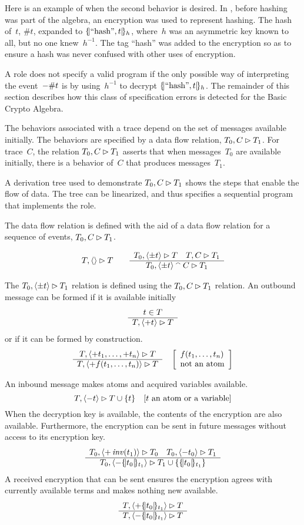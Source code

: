 \documentclass[12pt]{report}
\theoremstyle{definition}
\begin{document}
Here is an example of when the second behavior is desired.  In
{\cpsa}, before hashing was part of the algebra, an encryption was
used to represent hashing.  The hash of~$t$, $\#t$, expanded to
$\{\!|\mbox{``hash''},t|\!\}_{h}$, where~$h$ was an asymmetric key known to
all, but no one knew~$h^{-1}$.  The tag ``hash'' was added to the
encryption so as to ensure a hash was never confused with other uses of
encryption.

A role does not specify a valid program if the only possible way of
interpreting the event~$\mathord -\#t$ is by using~$h^{-1}$ to decrypt
$\{\!|\mbox{``hash''},t|\!\}_{h}$.  The remainder of this section describes
how this class of specification errors is detected for the Basic Crypto
Algebra.

The behaviors associated with a trace depend on the set of messages
available initially.  The behaviors are specified by a data flow
relation, $T_0,C\rhd T_1$.  For trace~$C$, the relation
$T_0,C\rhd T_1$ asserts that when messages~$T_0$ are available
initially, there is a behavior of~$C$ that produces messages~$T_1$.

A derivation tree used to demonstrate $T_0,C\rhd T_1$ shows the steps
that enable the flow of data.  The tree can be linearized, and thus
specifies a sequential program that implements the role.

The data flow relation is defined with the aid of a data flow relation
for a sequence of events, $T_0,C\rhd T_1$.

$$\flow{T}{\seq{}}{T}\qquad
\infer{\flow{T_0}{\seq{\pm t}}{T}\quad\flow{T}{C}{T_1}}%
{\flow{T_0}{\seq{\pm t}\append C}{T_1}}$$

The $T_0,\langle\pm t\rangle\rhd T_1$ relation is defined using the
$T_0,C\rhd T_1$ relation.  An outbound message can be formed if
it is available initially
$$\begin{array}{c}t\in T\\\hline T,\langle+t\rangle\rhd T\end{array}$$
or if it can be formed by construction.
$$\infer{\flow{T}{\seq{+t_1,\ldots,+t_{n}}}{T}}%
{\flow{T}{\seq{+f(t_1,\ldots,t_{n})}}{T}}\quad
\left[\begin{array}{l}
f(t_1,\ldots,t_{n})\\
\mbox{not an atom}
\end{array}\right]$$

An inbound message makes atoms and acquired variables available.
$$T,\langle-t\rangle\rhd T\cup\{t\}\quad [\mbox{$t$ an atom or a variable}]$$
When the decryption key is available, the contents of the encryption
are also available.  Furthermore, the encryption can be sent in future
messages without access to its encryption key.
$$\begin{array}{c}T_0,\langle+\operatorname{\mathit{inv}}(t_1)\rangle\rhd T_0\quad
  T_0,\langle-t_0\rangle\rhd T_1\\\hline\relax
  T_0,\langle-\{\!|t_0|\!\}_{t_1}\rangle\rhd T_1\cup\{\{\!|t_0|\!\}_{t_1}\}\end{array}$$ A received
encryption that can be sent ensures the encryption agrees with
currently available terms and makes nothing new available.
$$\begin{array}{c}T,\langle+\{\!|t_0|\!\}_{t_1}\rangle\rhd T\\\hline\relax
  T,\langle-\{\!|t_0|\!\}_{t_1}\rangle\rhd T\end{array}$$
\end{document}
